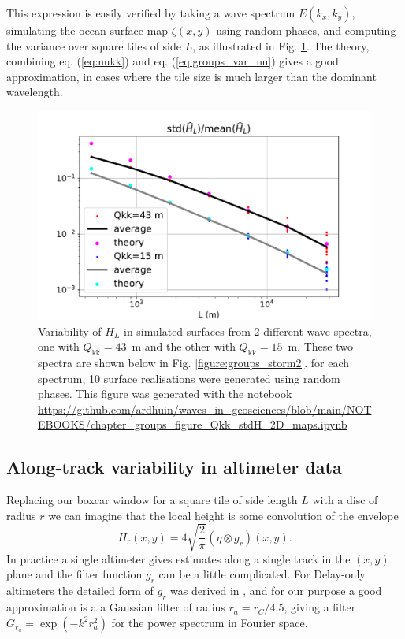 {This expression is easily verified by taking a wave spectrum $E(k_x,k_y)$, simulating the ocean surface map $\zeta(x,y)$ using random phases, and computing the variance over square tiles of side $L$, as illustrated in Fig. \ref{fig:groups_maps}. The theory, combining eq. (\ref{eq:nukk}) and eq. (\ref{eq:groups_var_nu}) gives a good approximation, in cases where the tile size is much larger than the dominant wavelength. 
\begin{figure}[htb]
\centerline{\includegraphics[width=\textwidth]{FIGS_CH_GROUPS/std_maps.pdf}}
  \caption{Variability of $H_L$ in simulated surfaces from 2 different wave spectra, one with $Q_{\mathrm{kk}}=43$~m and the other with $Q_{\mathrm{kk}}=15$~m. These two spectra are shown below in Fig. \ref{figure:groups_storm2}. for each spectrum, 10 surface realisations were generated using random phases. This figure was generated with the notebook \url{https://github.com/ardhuin/waves_in_geosciences/blob/main/NOTEBOOKS/chapter_groups_figure_Qkk_stdH_2D_maps.ipynb} }
\label{fig:groups_maps}
\end{figure}


\subsection{Along-track variability in altimeter data}
Replacing our boxcar window for a square tile of side length $L$ with a disc of radius $r$ we can imagine that the local height is some convolution of the envelope
\begin{equation}
    H_{r}(x,y) = 4\sqrt{\frac{2}{\pi}} (\eta \otimes g_{r})(x,y).
   \label{eq:relation_Hs_eta}
\end{equation}
In practice a single altimeter gives estimates along a single track in the $(x,y)$ plane and the filter function $g_r$ can be a little complicated. For Delay-only altimeters the detailed form of $g_r$ was derived in \cite{DeCarlo&al.2023}, and for our purpose a good approximation is a a Gaussian filter of radius $r_a=r_C/4.5$, giving a filter $G_{r_a}=\exp{(-k^2 r_a^2)}$ for the power spectrum in Fourier space.  

}
